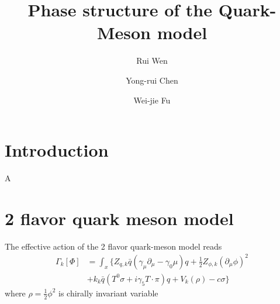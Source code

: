 \documentclass[%
reprint,
superscriptaddress,
showpacs,preprintnumbers,
 amsmath,amssymb,
 aps,
prd,
]{revtex4-1}
\begin{document}
\preprint{}

\title{Phase structure of the Quark-Meson model}

\author{Rui Wen}

\author{Yong-rui Chen}

\author{Wei-jie Fu}


\begin{abstract}

 


\end{abstract}

\maketitle


\section{Introduction}
\label{sec:intro}

A

\section{2 flavor quark meson model}
\label{sec:QM}

The effective action of the 2 flavor quark-meson model reads
\begin{align}
	\Gamma_k [\Phi]&=\int_x\{Z_{q,k} \bar q (\gamma_\mu \partial_\mu-\gamma_0 \mu)q +\frac{1}{2} Z_{\phi,k}(\partial_\mu \phi)^2 \nonumber\\[2ex]
	&+ k_k \bar q (T^0 \sigma +i \gamma_5 T \cdot \pi )q +V_k(\rho) - c \sigma \} \label{}
\end{align}
where $\rho=\frac{1}{2}\phi^2$ is chirally invariant variable
\end{document}
